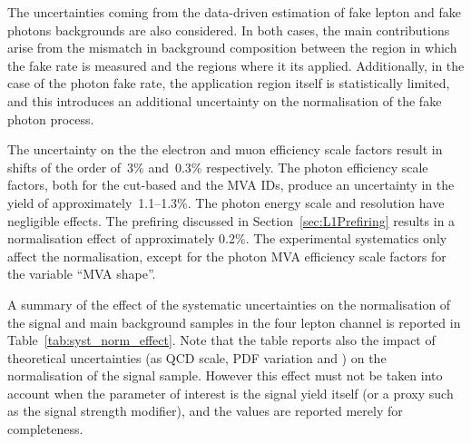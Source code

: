 
The uncertainties coming from the data-driven estimation of fake lepton and fake photons backgrounds are also considered.
In both cases, the main contributions arise from the mismatch in background composition between the region in which the fake rate is measured and the regions where it its applied.
Additionally, in the case of the photon fake rate, the application region itself is statistically limited, and this introduces an additional uncertainty on the normalisation of the fake photon process.

The uncertainty on the the electron and muon efficiency scale factors
result in shifts of the order of~3\usep\% and~0.3\usep\% respectively.
The photon efficiency scale factors, both for the cut-based and the MVA IDs,
produce an uncertainty in the yield of approximately~1.1--1.3\usep\%.
The photon energy scale and resolution have negligible effects.
The \Lone prefiring discussed in Section~\ref{sec:L1Prefiring}
results in a normalisation effect of approximately 0.2\usep\%.
The experimental systematics only affect the normalisation,
except for the photon MVA efficiency scale factors for the variable ``MVA shape''.

A summary of the effect of the systematic uncertainties on the normalisation
of the signal and main background samples in the four lepton channel is reported in Table~\ref{tab:syst_norm_effect}.
Note that the table reports also the impact of theoretical uncertainties
(\ie as QCD scale, PDF variation and \alpS) on the normalisation of the signal sample.
However this effect must not be taken into account when the parameter of interest is the
signal yield itself (or a proxy such as the signal strength modifier),
and the values are reported merely for completeness.

